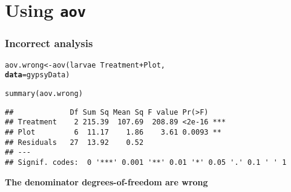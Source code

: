 \documentclass[color=usenames,dvipsnames]{beamer}\usepackage[]{graphicx}\usepackage[]{color}
\makeatletter
\newcommand{\hlopt}[1]{\textcolor[rgb]{0,0,0}{#1}}%
\newcommand{\hlstd}[1]{\textcolor[rgb]{0,0,0}{#1}}%
\newcommand{\hlkwb}[1]{\textcolor[rgb]{0,0.341,0.682}{#1}}%
\newcommand{\hlkwc}[1]{\textcolor[rgb]{0,0,0}{\textbf{#1}}}%
\newcommand{\hlkwd}[1]{\textcolor[rgb]{0.004,0.004,0.506}{#1}}%
\newenvironment{kframe}{%
 \def\at@end@of@kframe{}%
 \ifinner\ifhmode%
  \def\at@end@of@kframe{\end{minipage}}%
  \begin{minipage}{\columnwidth}%
 \fi\fi%
 \def\FrameCommand##1{\hskip\@totalleftmargin \hskip-\fboxsep
 \colorbox{shadecolor}{##1}\hskip-\fboxsep
     \hskip-\linewidth \hskip-\@totalleftmargin \hskip\columnwidth}%
 \MakeFramed {\advance\hsize-\width
   \@totalleftmargin\z@ \linewidth\hsize
   \@setminipage}}%
 {\par\unskip\endMakeFramed%
 \at@end@of@kframe}
\newenvironment{knitrout}{}{} %
\makeatother
\begin{document}
\section{Using {\tt aov}}



\begin{frame}[fragile]
  \frametitle{Incorrect analysis}
\begin{knitrout}\small
{}\color{fgcolor}\begin{kframe}
\begin{alltt}
\hlstd{aov.wrong} \hlkwb{<-} \hlkwd{aov}\hlstd{(larvae} \hlopt{~} \hlstd{Treatment} \hlopt{+} \hlstd{Plot,}
                 \hlkwc{data}\hlstd{=gypsyData)}
\end{alltt}
\end{kframe}
\end{knitrout}
\pause
\begin{knitrout}\small
{}\color{fgcolor}\begin{kframe}
\begin{alltt}
\hlkwd{summary}\hlstd{(aov.wrong)}
\end{alltt}
\begin{verbatim}
##             Df Sum Sq Mean Sq F value Pr(>F)    
## Treatment    2 215.39  107.69  208.89 <2e-16 ***
## Plot         6  11.17    1.86    3.61 0.0093 ** 
## Residuals   27  13.92    0.52                   
## ---
## Signif. codes:  0 '***' 0.001 '**' 0.01 '*' 0.05 '.' 0.1 ' ' 1
\end{verbatim}
\end{kframe}
\end{knitrout}
\pause
\vfill
\centering
\large
\bf
\alert{The denominator degrees-of-freedom are wrong} \\
\end{frame}
\end{document}
